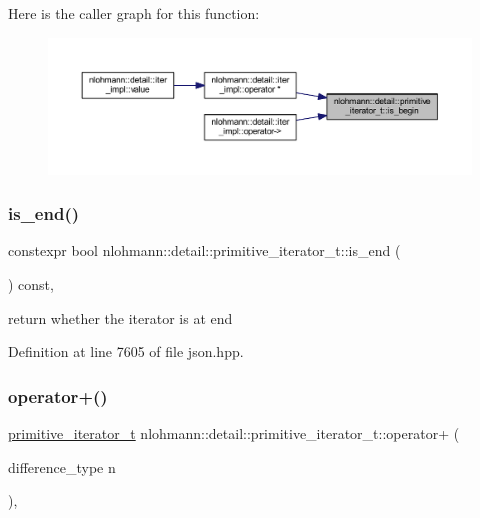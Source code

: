 Here is the caller graph for this function\+:
\nopagebreak
\begin{figure}[H]
\begin{center}
\leavevmode
\includegraphics[width=350pt]{classnlohmann_1_1detail_1_1primitive__iterator__t_a8d1a7d46b3fcd06edd034f04ededb5e4_icgraph}
\end{center}
\end{figure}
\mbox{\label{classnlohmann_1_1detail_1_1primitive__iterator__t_a45a7e301c23b5b90417baf2277f40b1d}} 
\subsubsection{\texorpdfstring{is\_end()}{is\_end()}}
{\footnotesize\ttfamily constexpr bool nlohmann\+::detail\+::primitive\+\_\+iterator\+\_\+t\+::is\+\_\+end (\begin{DoxyParamCaption}{ }\end{DoxyParamCaption}) const\hspace{0.3cm}{\ttfamily [inline]}, {\ttfamily [noexcept]}}



return whether the iterator is at end 



Definition at line 7605 of file json.\+hpp.

\mbox{\label{classnlohmann_1_1detail_1_1primitive__iterator__t_a00ce828d0fe58046c10e0445504df7bf}} 
\subsubsection{\texorpdfstring{operator+()}{operator+()}}
{\footnotesize\ttfamily \mbox{\hyperlink{classnlohmann_1_1detail_1_1primitive__iterator__t}{primitive\+\_\+iterator\+\_\+t}} nlohmann\+::detail\+::primitive\+\_\+iterator\+\_\+t\+::operator+ (\begin{DoxyParamCaption}\item[{difference\+\_\+type}]{n }\end{DoxyParamCaption})\hspace{0.3cm}{\ttfamily [inline]}, {\ttfamily [noexcept]}}




